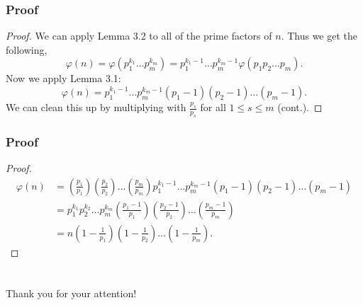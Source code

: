 \documentclass[envcountsect]{beamer}
\begin{document}
\begin{frame}
\frametitle{Proof}
\begin{proof}\renewcommand{\qedsymbol}{}
We can apply Lemma 3.2 to all of the prime factors of $n$. Thus we get the
following, 
$$ \varphi(n)=\varphi(p_1^{k_1} \dots p_m^{k_m}) =
p_1^{k_1-1} \dots p_m^{k_m-1}\varphi(p_1p_2 \dots p_m).$$
Now we apply Lemma 3.1:
$$ \varphi(n) = p_1^{k_1-1} \dots
p_m^{k_m-1}(p_1-1)(p_2-1)\dots(p_m-1). $$
We can clean this up by multiplying with $\frac{p_s}{p_s}$ for all $1 \leq s
\leq m$ (cont.).
\end{proof}

\end{frame}

\begin{frame}
\frametitle{Proof}

\begin{proof}
\footnotesize
\begin{align*}
\varphi(n) &= \left(\frac{p_1}{p_1}\right) \left(\frac{p_2}{p_2}\right)\dots 
\left(\frac{p_m}{p_m}\right) p_1^{k_1-1} \dots
p_m^{k_m-1}(p_1-1)(p_2-1)\dots(p_m-1) \\
 &= p_1^{k_1}p_2^{k_2}\dots p_m^{k_m}\left(\frac{p_1 -
 1}{p_1}\right)\left(\frac{p_2 - 1}{p_2}\right) \dots \left(\frac{p_m -
 1}{p_m}\right) \\
&= n\left(1-\frac{1}{p_1}\right) \left(1-\frac{1}{p_2}\right) \dots
\left(1-\frac{1}{p_m}\right).
\end{align*}
\end{proof}

\end{frame}

\section{}
\begin{frame}
\centering
\vfil
\Large
Thank you for your attention!
\vfil
\end{frame}
\end{document}
